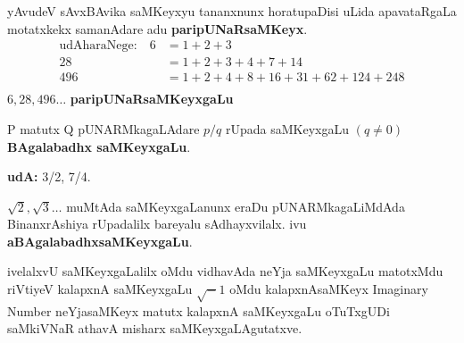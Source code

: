 yAvudeV sAvxBAvika saMKeyxyu tananxnunx horatupaDisi uLida apavataRgaLa motatxkekx samanAdare adu \textbf{paripUNaRsaMKeyx}.
\begin{align*}
\text{udAharaNege:}\quad  6 &= 1+2+3\\
28 &= 1+2+3+4+7+14\\
496 &= 1+2+4+8+16+31+62+124+248\\
\end{align*} 
$6,28,496\ldots$ \textbf{paripUNaRsaMKeyxgaLu}

{\rm P} matutx {\rm Q} pUNARMkagaLAdare $p/q$ rUpada saMKeyxgaLu $(q\neq 0)$ \textbf{BAgalabadhx saMKeyxgaLu}.

\textbf{udA:} {\rm 3/2, 7/4}.

${\sqrt 2}, {\sqrt 3}\ldots$ muMtAda saMKeyxgaLanunx eraDu pUNARMkagaLiMdAda BinanxrAshiya rUpadalilx bareyalu sAdhayxvilalx. ivu \textbf{aBAgalabadhxsaMKeyxgaLu}.

ivelalxvU saMKeyxgaLalilx oMdu vidhavAda neYja saMKeyxgaLu matotxMdu riVtiyeV kalapxnA  saMKeyxgaLu $\sqrt-1$ oMdu kalapxnAsaMKeyx {\rm Imaginary Number} neYjasaMKeyx matutx kalapxnA saMKeyxgaLu oTuTxgUDi saMkiVNaR athavA misharx saMKeyxgaLAgutatxve. 
